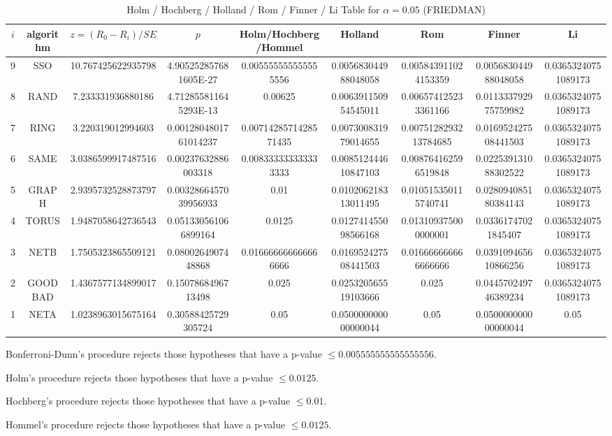 \documentclass[a4paper,10pt]{article}
\begin{document}
\begin{landscape}
\begin{table}[!htp]
\centering\scriptsize
\caption{Holm / Hochberg / Holland / Rom / Finner / Li Table for $\alpha=0.05$ (FRIEDMAN)}
\begin{tabular}{ccccccccc}
$i$&algorithm&$z=(R_0 - R_i)/SE$&$p$&Holm/Hochberg/Hommel&Holland&Rom&Finner&Li\\
\hline
9& SSO&10.767425622935798&4.905252857681605E-27&0.005555555555555556&0.005683044988048058&0.005843911024153359&0.005683044988048058&0.03653240751089173\\
8& RAND&7.233331936880186&4.712855811645293E-13&0.00625&0.006391150954545011&0.006574125233361166&0.011333792975759982&0.03653240751089173\\
7& RING&3.220319012994603&0.0012804801761014237&0.0071428571428571435&0.007300831979014655&0.0075128293213784685&0.016952427508441503&0.03653240751089173\\
6& SAME&3.0386599917487516&0.00237632886003318&0.008333333333333333&0.008512444610847103&0.008764162596519848&0.022539131088302522&0.03653240751089173\\
5& GRAPH&2.9395732528873797&0.0032866457039956933&0.01&0.010206218313011495&0.010515350115740741&0.028094085180384143&0.03653240751089173\\
4& TORUS&1.9487058642736543&0.051330561066899164&0.0125&0.012741455098566168&0.013109375000000001&0.03361747021845407&0.03653240751089173\\
3& NETB&1.7505323865509121&0.0800264907448868&0.016666666666666666&0.016952427508441503&0.016666666666666666&0.039109465610866256&0.03653240751089173\\
2& GOODBAD&1.4367577134899017&0.1507868496713498&0.025&0.025320565519103666&0.025&0.044570249746389234&0.03653240751089173\\
1& NETA&1.0238963015675164&0.30588425729305724&0.05&0.050000000000000044&0.05&0.050000000000000044&0.05\\
\hline
\end{tabular}
\end{table}
Bonferroni-Dunn's procedure rejects those hypotheses that have a p-value $\le0.005555555555555556$.


Holm's procedure rejects those hypotheses that have a p-value $\le0.0125$.


Hochberg's procedure rejects those hypotheses that have a p-value $\le0.01$.


Hommel's procedure rejects those hypotheses that have a p-value $\le0.0125$.



\end{landscape}
\end{document}
